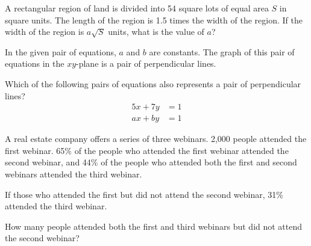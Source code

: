 \noindent\markforreview
\vspace{1em}

A rectangular region of land is divided into 54 square lots of equal area \(S\) in square units. The length of the region is 1.5 times the width of the region. If the width of the region is \(a\sqrt{S}\) units, what is the value of \(a\)?

\vspace{0.75em}


\vspace{2em}
\newpage

\noindent\markforreview
\vspace{1em}

In the given pair of equations, \(a\) and \(b\) are constants. The graph of this pair of equations in the \(xy\)-plane is a pair of perpendicular lines.

Which of the following pairs of equations also represents a pair of perpendicular lines?
\[
\begin{aligned}
5x + 7y &= 1 \\
ax + by &= 1
\end{aligned}
\]

\vspace{0.75em}


\vspace{2em}
\newpage

\noindent\markforreview
\vspace{1em}

A real estate company offers a series of three webinars. 2,000 people attended the first webinar. 65\% of the people who attended the first webinar attended the second webinar, and 44\% of the people who attended both the first and second webinars attended the third webinar.

If those who attended the first but did not attend the second webinar, 31\% attended the third webinar.

How many people attended both the first and third webinars but did not attend the second webinar?

\vspace{0.75em}


